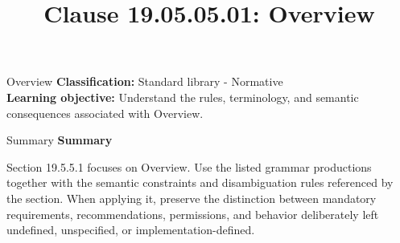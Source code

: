 \documentclass[10pt,letterpaper]{article}
\title{Clause 19.05.05.01: Overview}
\author{}
\date{}
\begin{document}
\maketitle
\begin{CornellOverviewBox}{Overview}
\textbf{Classification:} Standard library - Normative\\[2pt]
\textbf{Learning objective:} Understand the rules, terminology, and semantic consequences associated with Overview.
\end{CornellOverviewBox}\begin{CornellSummaryBox}{Summary}
{\sffamily\bfseries\color{Accent} Summary}\par\vspace{3pt}Section 19.5.5.1 focuses on Overview. Use the listed grammar productions together with the semantic constraints and disambiguation rules referenced by the section. When applying it, preserve the distinction between mandatory requirements, recommendations, permissions, and behavior deliberately left undefined, unspecified, or implementation-defined.
\end{CornellSummaryBox}
\end{document}
